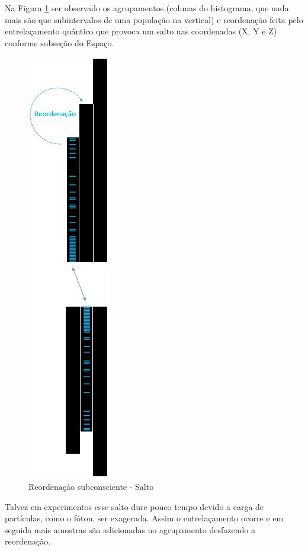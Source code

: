Na Figura \ref{fig:consciousness_space_subconscious_observation_jump} ser observado os agrupamentos (colunas do histograma, que nada mais são que subintervalos de uma população na vertical) e reordenação feita pelo entrelaçamento quântico que provoca um salto nas coordenadas (X, Y e Z) conforme subseção do Espaço.
	\begin{figure}[H]
	\caption{Reordenação subconsciente - Salto}
	\label{fig:consciousness_space_subconscious_observation_jump}
	\centering
	\includegraphics[scale=.6]{sections/images/consciousness_space_subconscious_observation_jump.jpg}
	\end{figure}

Talvez em experimentos esse salto dure pouco tempo devido a carga de partículas, como o fóton, ser exagerada. Assim o entrelaçamento ocorre e em seguida mais amostras são adicionadas no agrupamento desfazendo a reordenação. 

